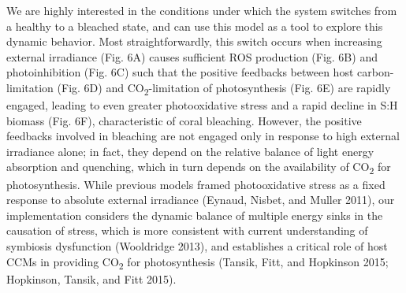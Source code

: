 \documentclass[]{elsarticle} %
\begin{document}
We are highly interested in the conditions under which the system
switches from a healthy to a bleached state, and can use this model as a
tool to explore this dynamic behavior. Most straightforwardly, this
switch occurs when increasing external irradiance (Fig. 6A) causes
sufficient ROS production (Fig. 6B) and photoinhibition (Fig. 6C) such
that the positive feedbacks between host carbon-limitation (Fig. 6D) and
CO\textsubscript{2}-limitation of photosynthesis (Fig. 6E) are rapidly
engaged, leading to even greater photooxidative stress and a rapid
decline in S:H biomass (Fig. 6F), characteristic of coral bleaching.
However, the positive feedbacks involved in bleaching are not engaged
only in response to high external irradiance alone; in fact, they depend
on the relative balance of light energy absorption and quenching, which
in turn depends on the availability of CO\textsubscript{2} for
photosynthesis. While previous models framed photooxidative stress as a
fixed response to absolute external irradiance (Eynaud, Nisbet, and
Muller 2011), our implementation considers the dynamic balance of
multiple energy sinks in the causation of stress, which is more
consistent with current understanding of symbiosis dysfunction
(Wooldridge 2013), and establishes a critical role of host CCMs in
providing CO\textsubscript{2} for photosynthesis (Tansik, Fitt, and
Hopkinson 2015; Hopkinson, Tansik, and Fitt 2015).
\end{document}
